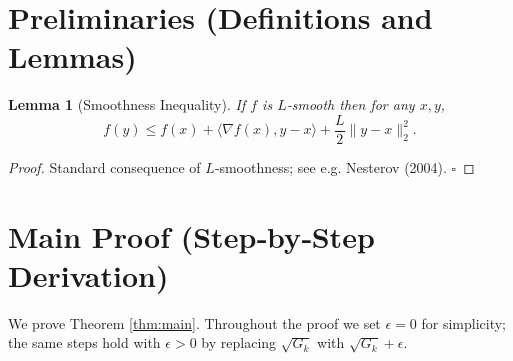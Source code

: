 \documentclass{article}
\newtheorem{lemma}{Lemma}
\begin{document}
\newpage
\section*{Preliminaries (Definitions and Lemmas)}
\begin{lemma}[Smoothness Inequality]\label{lem:smooth}
If $f$ is $L$‑smooth then for any $x,y$,
\[
f(y)\le f(x)+\langle\nabla f(x),y-x\rangle+\frac{L}{2}\|y-x\|_{2}^{2}.
\]
\end{lemma}
\begin{proof}
Standard consequence of $L$‑smoothness; see e.g. Nesterov (2004). \hfill $\square$
\end{proof}

\section*{Main Proof (Step‑by‑Step Derivation)}
We prove Theorem \ref{thm:main}. Throughout the proof we set $\epsilon=0$ for simplicity; the same steps hold with $\epsilon>0$ by replacing $\sqrt{G_{k}}$ with $\sqrt{G_{k}}+\epsilon$.
\end{document}
